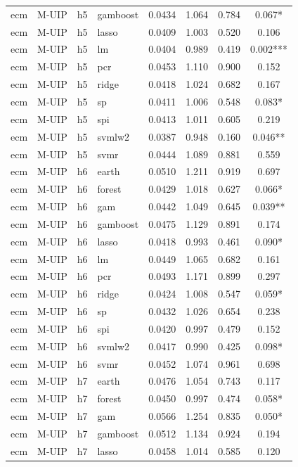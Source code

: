 \begin{ThreePartTable}
\begin{longtable}[t]{llclcccc}
ecm & M-UIP & h5 & gamboost & 0.0434 & 1.064 & 0.784 & 0.067*\\
ecm & M-UIP & h5 & lasso & 0.0409 & 1.003 & 0.520 & 0.106\\
ecm & M-UIP & h5 & lm & 0.0404 & 0.989 & 0.419 & 0.002***\\
ecm & M-UIP & h5 & pcr & 0.0453 & 1.110 & 0.900 & 0.152\\
ecm & M-UIP & h5 & ridge & 0.0418 & 1.024 & 0.682 & 0.167\\
ecm & M-UIP & h5 & sp & 0.0411 & 1.006 & 0.548 & 0.083*\\
ecm & M-UIP & h5 & spi & 0.0413 & 1.011 & 0.605 & 0.219\\
ecm & M-UIP & h5 & svmlw2 & 0.0387 & 0.948 & 0.160 & 0.046**\\
ecm & M-UIP & h5 & svmr & 0.0444 & 1.089 & 0.881 & 0.559\\
\addlinespace
ecm & M-UIP & h6 & earth & 0.0510 & 1.211 & 0.919 & 0.697\\
ecm & M-UIP & h6 & forest & 0.0429 & 1.018 & 0.627 & 0.066*\\
ecm & M-UIP & h6 & gam & 0.0442 & 1.049 & 0.645 & 0.039**\\
ecm & M-UIP & h6 & gamboost & 0.0475 & 1.129 & 0.891 & 0.174\\
ecm & M-UIP & h6 & lasso & 0.0418 & 0.993 & 0.461 & 0.090*\\
ecm & M-UIP & h6 & lm & 0.0449 & 1.065 & 0.682 & 0.161\\
ecm & M-UIP & h6 & pcr & 0.0493 & 1.171 & 0.899 & 0.297\\
ecm & M-UIP & h6 & ridge & 0.0424 & 1.008 & 0.547 & 0.059*\\
ecm & M-UIP & h6 & sp & 0.0432 & 1.026 & 0.654 & 0.238\\
ecm & M-UIP & h6 & spi & 0.0420 & 0.997 & 0.479 & 0.152\\
ecm & M-UIP & h6 & svmlw2 & 0.0417 & 0.990 & 0.425 & 0.098*\\
ecm & M-UIP & h6 & svmr & 0.0452 & 1.074 & 0.961 & 0.698\\
\addlinespace
ecm & M-UIP & h7 & earth & 0.0476 & 1.054 & 0.743 & 0.117\\
ecm & M-UIP & h7 & forest & 0.0450 & 0.997 & 0.474 & 0.058*\\
ecm & M-UIP & h7 & gam & 0.0566 & 1.254 & 0.835 & 0.050*\\
ecm & M-UIP & h7 & gamboost & 0.0512 & 1.134 & 0.924 & 0.194\\
ecm & M-UIP & h7 & lasso & 0.0458 & 1.014 & 0.585 & 0.120\\

\end{longtable}
\end{ThreePartTable}
